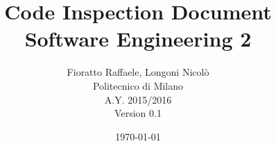 \begin{figure}
  \centering
	\def\svgwidth{\columnwidth}
    \resizebox{0.35\textwidth}{!}{}
\end{figure}
\title{{\Huge \textbf{C}ode \textbf{I}nspection \textbf{D}ocument}\\{\Large Software Engineering 2}}

\author{Fioratto Raffaele, Longoni Nicol\`{o}
\\Politecnico di Milano
\\{\small A.Y. 2015/2016}
\\{\small Version 0.1}}
\date{\today}
\maketitle
\newpage
\tableofcontents
\listoffigures